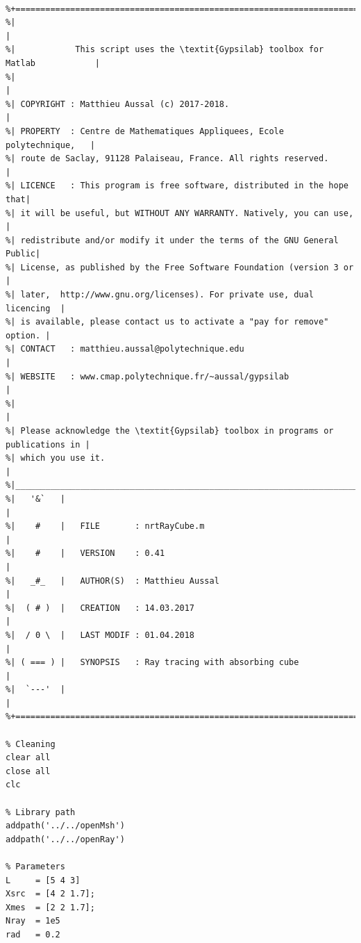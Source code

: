 \documentclass[AMA,STIX1COL]{WileyNJD-v2}
\begin{document}
\begin{lstlisting}[style=Matlab-editor,basicstyle=\footnotesize]

%+========================================================================+
%|                                                                        |
%|            This script uses the \textit{Gypsilab} toolbox for Matlab            |
%|                                                                        |
%| COPYRIGHT : Matthieu Aussal (c) 2017-2018.                             |
%| PROPERTY  : Centre de Mathematiques Appliquees, Ecole polytechnique,   |
%| route de Saclay, 91128 Palaiseau, France. All rights reserved.         |
%| LICENCE   : This program is free software, distributed in the hope that|
%| it will be useful, but WITHOUT ANY WARRANTY. Natively, you can use,    |
%| redistribute and/or modify it under the terms of the GNU General Public|
%| License, as published by the Free Software Foundation (version 3 or    |
%| later,  http://www.gnu.org/licenses). For private use, dual licencing  |
%| is available, please contact us to activate a "pay for remove" option. |
%| CONTACT   : matthieu.aussal@polytechnique.edu                          |
%| WEBSITE   : www.cmap.polytechnique.fr/~aussal/gypsilab                 |
%|                                                                        |
%| Please acknowledge the \textit{Gypsilab} toolbox in programs or publications in |
%| which you use it.                                                      |
%|________________________________________________________________________|
%|   '&`   |                                                              |
%|    #    |   FILE       : nrtRayCube.m                                  |
%|    #    |   VERSION    : 0.41                                          |
%|   _#_   |   AUTHOR(S)  : Matthieu Aussal                               |
%|  ( # )  |   CREATION   : 14.03.2017                                    |
%|  / 0 \  |   LAST MODIF : 01.04.2018                                    |
%| ( === ) |   SYNOPSIS   : Ray tracing with absorbing cube               |
%|  `---'  |                                                              |
%+========================================================================+

% Cleaning
clear all
close all
clc

% Library path
addpath('../../openMsh')
addpath('../../openRay')

% Parameters
L     = [5 4 3]
Xsrc  = [4 2 1.7];
Xmes  = [2 2 1.7];
Nray  = 1e5
rad   = 0.2


\end{lstlisting}
\end{document}
